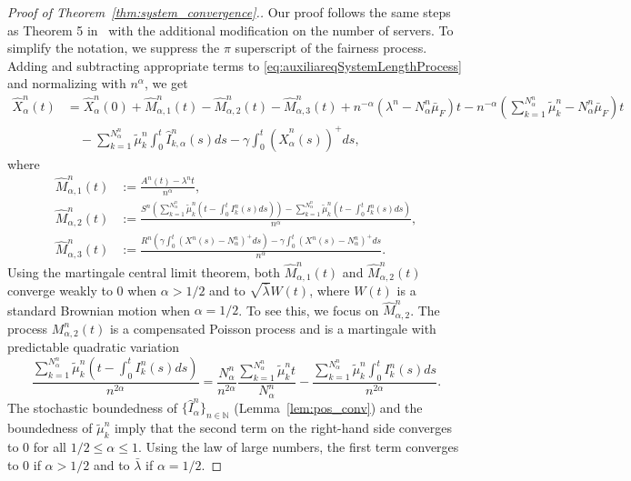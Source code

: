 \documentclass[a4paper,11pt,twoside]{article}
\numberwithin{equation}{section}
\numberwithin{figure}{section}
\theoremstyle{plain}
\newcommand{\NN}{\mathbb{N}}
\newcommand{\1}{\mathbbm{1}}
\begin{document}
\begin{proof}[Proof of Theorem~\ref{thm:system_convergence}.]
Our proof follows the same steps as Theorem 5 in~\cite{bukeqin2019} with the additional modification on the number of servers. To simplify the notation, we suppress the $\pi$ superscript of the fairness process. Adding and subtracting appropriate terms to \eqref{eq:auxiliareqSystemLengthProcess} and normalizing with $n^\alpha$, we get
\begin{align}
\nonumber
    \hat{X}_\alpha^n(t)&=\hat{X}_\alpha^n(0)+\hat{M}_{\alpha,1}^n(t)-\hat{M}_{\alpha,2}^n(t) -\hat{M}_{\alpha,3}^n(t)+n^{-\alpha}(\lambda^n-N_\alpha^n\bar{\mu}_F)t-n^{-\alpha}\left(\sum_{k=1}^{N_\alpha^n}\tilde{\mu}_k^n-N_\alpha^n\bar{\mu}_F\right)t
    \\
    &\quad-\sum_{k=1}^{N_\alpha^n}\tilde{\mu}_{k}^n\int_0^t\hat{I}_{k,\alpha}^n(s)ds-\gamma\int_0^t(\hat{X}_\alpha^n(s))^+ds,
    \label{eq:scaled_decomposition}
\end{align}
where
\begin{align*}
    \displaystyle\hat{M}_{\alpha,1}^n(t)
    &:=\frac{A^n(t)-\lambda^nt}{n^\alpha},
    \\
    \hat{M}_{\alpha,2}^n(t)
    &:=\frac{S^n\left(\sum_{k=1}^{N_\alpha^n}\tilde{\mu}_{k}^n\left(t-\int_0^tI_k^n(s)ds\right)\right)-\sum_{k=1}^{N_\alpha^n}\tilde{\mu}_{k}^n\left(t-\int_0^tI_k^n(s)ds\right)}{n^\alpha},
    \\
    \displaystyle\hat{M}_{\alpha,3}^n(t)
    &:=\frac{R^n\left(\gamma\int_0^t(X^n(s)-N_\alpha^n)^+ds\right)-\gamma\int_0^t(X^n(s)-N_\alpha^n)^+ds}{n^\alpha}.
\end{align*}
Using the martingale central limit theorem, both $\hat{M}_{\alpha,1}^n(t)$ and $\hat{M}_{\alpha,2}^n(t)$ converge weakly to $0$ when $\alpha>1/2$ and to $\sqrt{\bar{\lambda}}W(t)$, where $W(t)$ is a standard Brownian motion when $\alpha=1/2$. To see this, we focus on $\hat{M}_{\alpha,2}^n$. The process $M_{\alpha,2}^n(t)$ is a compensated Poisson process and is a martingale with predictable quadratic variation
\[
\frac{\sum_{k=1}^{N_\alpha^n}\tilde{\mu}_{k}^n\left(t-\int_0^tI_k^n(s)ds\right)}{n^{2\alpha}}=\frac{N_\alpha^n}{n^{2\alpha}}\frac{\sum_{k=1}^{N_\alpha^n}\tilde{\mu}_{k}^nt}{N_{\alpha}^n}-\frac{\sum_{k=1}^{N_\alpha^n}\tilde{\mu}_k^n\int_0^t I_k^n(s)ds}{n^{2\alpha}}.
\]
The stochastic boundedness of $\{\hat{I}_\alpha^n\}_{n\in \NN}$ (Lemma~\ref{lem:pos_conv}) and the boundedness of $\tilde{\mu}_k^n$ imply that the second term on the right-hand side converges to 
$0$ for all $1/2\leq \alpha\leq 1$. Using the law of large numbers, the first term converges to $0$ if $\alpha>1/2$ and to $\bar{\lambda}$ if $\alpha=1/2$. 

\end{proof}
\end{document}

